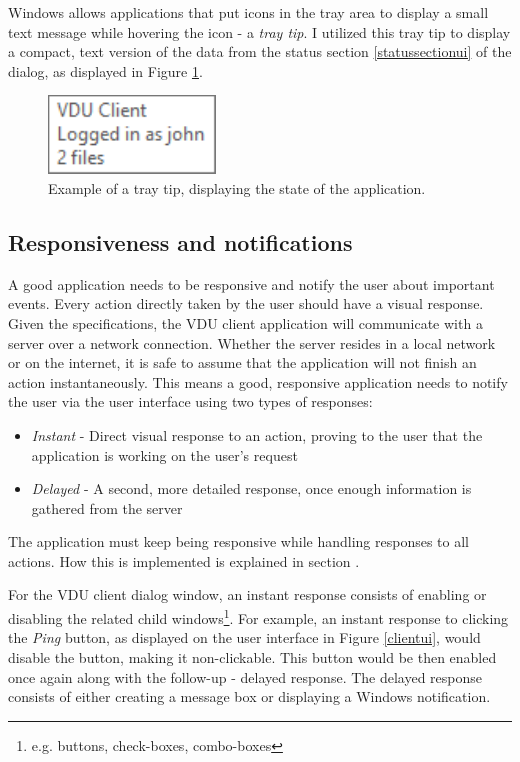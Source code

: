 Windows allows applications that put icons in the tray area to display a small text message while hovering the icon - a \textit{tray tip}. I utilized this tray tip to display a compact, text version of the data from the status section \ref{statussectionui} of the dialog, as displayed in Figure \ref{traytipex}.

\begin{figure}[htb]
    \centering
	\includegraphics[]{obrazky-figures/traytip.pdf}
	\caption{Example of a tray tip, displaying the state of the application.}
	\label{traytipex}
\end{figure}

\subsection{Responsiveness and notifications}
A good application needs to be responsive and notify the user about important events. Every action directly taken by the user should have a visual response. Given the specifications, the VDU client application will communicate with a server over a network connection. Whether the server resides in a local network or on the internet, it is safe to assume that the application will not finish an action instantaneously. This means a good, responsive application needs to notify the user via the user interface using two types of responses:
\begin{itemize}
    \item \textit{Instant} - Direct visual response to an action, proving to the user that the application is working on the user's request
    \item \textit{Delayed} - A second, more detailed response, once enough information is gathered from the server
\end{itemize}

The application must keep being responsive while handling responses to all actions. How this is implemented is explained in section .

For the VDU client dialog window, an instant response consists of enabling or disabling the related child windows\footnote{e.g. buttons, check-boxes, combo-boxes}. For example, an instant response to clicking the \textit{Ping} button, as displayed on the user interface in Figure \ref{clientui}, would disable the button, making it non-clickable. This button would be then enabled once again along with the follow-up - delayed response.
The delayed response consists of either creating a message box or displaying a Windows notification.

